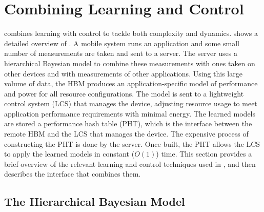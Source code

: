 \section{Combining Learning and Control}
\label{sec:framework}

\SYSTEM{} combines learning with control to tackle both complexity and
dynamics.   shows a detailed overview of
\SYSTEM{}.  A mobile system runs an application and some small number
of measurements are taken and sent to a server. The server uses a
hierarchical Bayesian model to combine these measurements with ones
taken on other devices and with measurements of other applications.
Using this large volume of data, the HBM produces an
application-specific model of performance and power for all resource
configurations.  The model is sent to a lightweight control system
(LCS) that manages the device, adjusting resource usage to meet
application performance requirements with minimal energy.  The learned
models are stored a performance hash table (PHT), which is the
interface between the remote HBM and the LCS that manages the device.
The expensive process of constructing the PHT is done by the server.
Once built, the PHT allows the LCS to apply the learned models in
constant ($O(1)$) time.  This section provides a brief overview of the
relevant learning and control techniques used in \SYSTEM{}, and then
describes the interface that combines them.

\subsection{The Hierarchical Bayesian Model}
\label{sec:framework:HBM}

